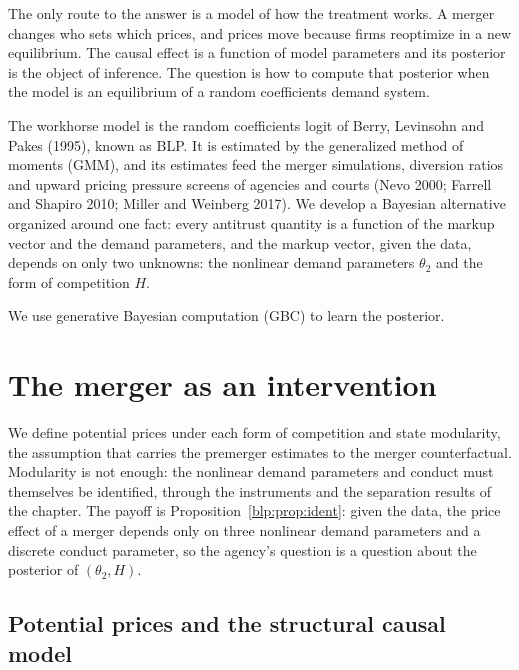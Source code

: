The only route to the answer is a model of how the treatment works. A merger changes who sets which prices, and prices move because firms reoptimize in a new equilibrium. The causal effect is a function of model parameters and its posterior is the object of inference. The question is how to compute that posterior when the model is an equilibrium of a random coefficients demand system.

The workhorse model is the random coefficients logit of Berry, Levinsohn and Pakes (1995), known as BLP. It is estimated by the generalized method of moments (GMM), and its estimates feed the merger simulations, diversion ratios and upward pricing pressure screens of agencies and courts (Nevo 2000; Farrell and Shapiro 2010; Miller and Weinberg 2017). We develop a Bayesian alternative organized around one fact: every antitrust quantity is a function of the markup vector and the demand parameters, and the markup vector, given the data, depends on only two unknowns: the nonlinear demand parameters $\theta_2$ and the form of competition $H$.

We use generative Bayesian computation (GBC) to learn the posterior.

\section{The merger as an intervention}\label{blp:sec:causal}

We define potential prices under each form of competition and state modularity, the assumption that carries the premerger estimates to the merger counterfactual. Modularity is not enough: the nonlinear demand parameters and conduct must themselves be identified, through the instruments and the separation results of the chapter. The payoff is Proposition~\ref{blp:prop:ident}: given the data, the price effect of a merger depends only on three nonlinear demand parameters and a discrete conduct parameter, so the agency's question is a question about the posterior of $(\theta_2,H)$.

\subsection{Potential prices and the structural causal model}

